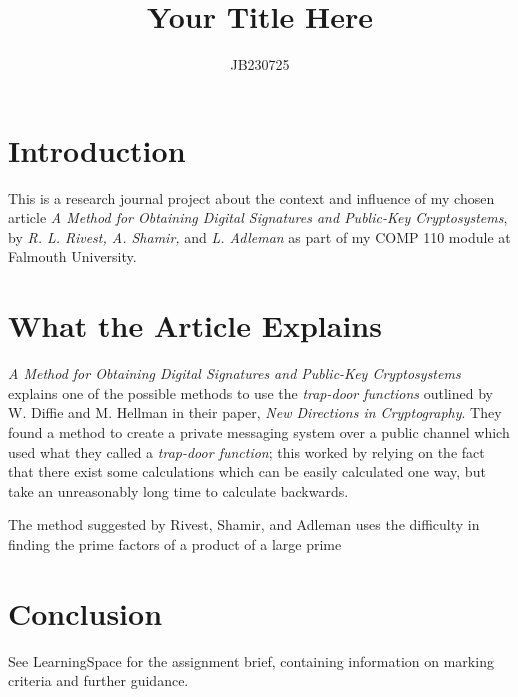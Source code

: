 \documentclass{article}
\title{Your Title Here}
\author{JB230725}
\begin{document}
\maketitle

\section{Introduction}

This is a research journal project about the context and influence of my chosen article \textit{A Method for Obtaining Digital Signatures and Public-Key Cryptosystems}, by \textit{R. L. Rivest, A. Shamir,} and \textit{L. Adleman} \cite{rivest1978_rsa} as part of my COMP 110 module at Falmouth University.

\section{What the Article Explains}

\textit{A Method for Obtaining Digital Signatures and Public-Key Cryptosystems} explains one of the possible methods to use the \textit{trap-door functions} outlined by W. Diffie and M. Hellman in their paper, \textit{New Directions in Cryptography}\cite{diffie1976new}. They found a method to create a private messaging system over a public channel which used what they called a \textit{trap-door function}; this worked by relying on the fact that there exist some calculations which can be easily calculated one way, but take an unreasonably long time to calculate backwards.

The method suggested by Rivest, Shamir, and Adleman uses the difficulty in finding the prime factors of a product of a large prime

\section{Conclusion}

See LearningSpace for the assignment brief, containing information on marking criteria and further guidance.



\end{document}
